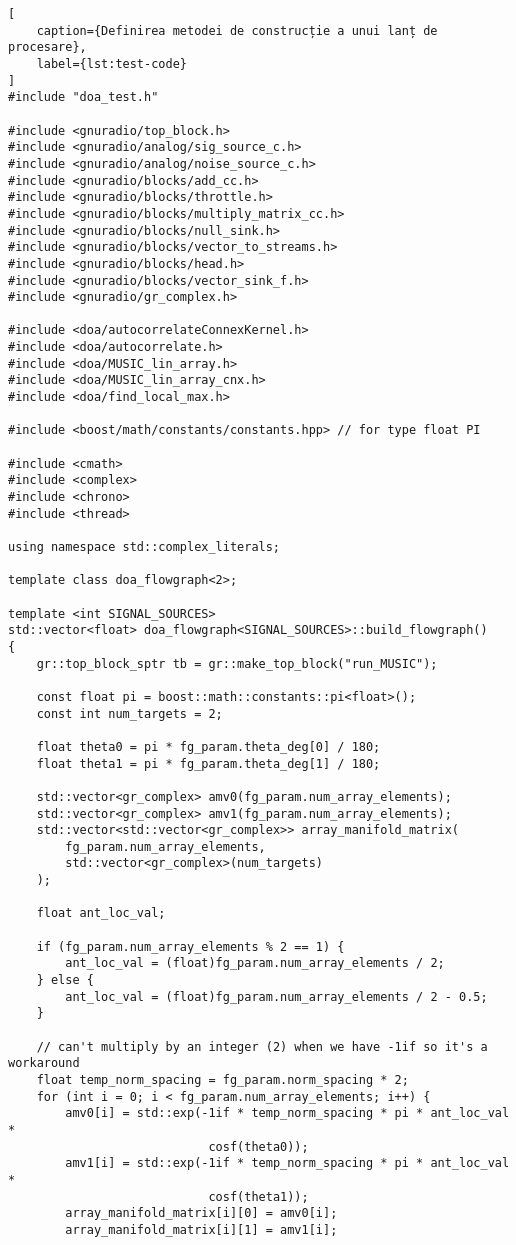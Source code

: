 \begin{lstlisting}[
    caption={Definirea metodei de construcție a unui lanț de procesare},
    label={lst:test-code}
]
#include "doa_test.h"

#include <gnuradio/top_block.h>
#include <gnuradio/analog/sig_source_c.h>
#include <gnuradio/analog/noise_source_c.h>
#include <gnuradio/blocks/add_cc.h>
#include <gnuradio/blocks/throttle.h>
#include <gnuradio/blocks/multiply_matrix_cc.h>
#include <gnuradio/blocks/null_sink.h>
#include <gnuradio/blocks/vector_to_streams.h>
#include <gnuradio/blocks/head.h>
#include <gnuradio/blocks/vector_sink_f.h>
#include <gnuradio/gr_complex.h>

#include <doa/autocorrelateConnexKernel.h>
#include <doa/autocorrelate.h>
#include <doa/MUSIC_lin_array.h>
#include <doa/MUSIC_lin_array_cnx.h>
#include <doa/find_local_max.h>

#include <boost/math/constants/constants.hpp> // for type float PI

#include <cmath>
#include <complex>
#include <chrono>
#include <thread>

using namespace std::complex_literals;

template class doa_flowgraph<2>;

template <int SIGNAL_SOURCES>
std::vector<float> doa_flowgraph<SIGNAL_SOURCES>::build_flowgraph()
{
    gr::top_block_sptr tb = gr::make_top_block("run_MUSIC");

    const float pi = boost::math::constants::pi<float>();
    const int num_targets = 2;

    float theta0 = pi * fg_param.theta_deg[0] / 180;
    float theta1 = pi * fg_param.theta_deg[1] / 180;

    std::vector<gr_complex> amv0(fg_param.num_array_elements);
    std::vector<gr_complex> amv1(fg_param.num_array_elements);
    std::vector<std::vector<gr_complex>> array_manifold_matrix(
        fg_param.num_array_elements,
        std::vector<gr_complex>(num_targets)
    );

    float ant_loc_val;

    if (fg_param.num_array_elements % 2 == 1) {
        ant_loc_val = (float)fg_param.num_array_elements / 2;
    } else {
        ant_loc_val = (float)fg_param.num_array_elements / 2 - 0.5;
    }

    // can't multiply by an integer (2) when we have -1if so it's a workaround
    float temp_norm_spacing = fg_param.norm_spacing * 2;
    for (int i = 0; i < fg_param.num_array_elements; i++) {
        amv0[i] = std::exp(-1if * temp_norm_spacing * pi * ant_loc_val *
                            cosf(theta0));
        amv1[i] = std::exp(-1if * temp_norm_spacing * pi * ant_loc_val *
                            cosf(theta1));
        array_manifold_matrix[i][0] = amv0[i];
        array_manifold_matrix[i][1] = amv1[i];


\end{lstlisting}
